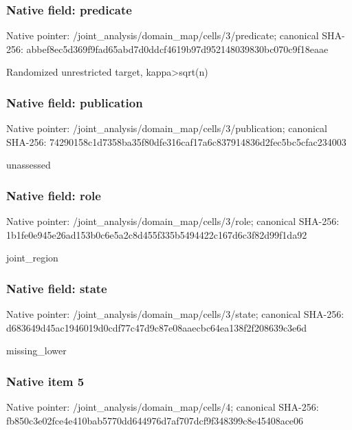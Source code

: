 \documentclass[10pt,a4paper]{article}
\begin{document}
\subsubsection{Native field: predicate}
Native pointer: /joint\_\allowbreak{}analysis/domain\_\allowbreak{}map/cells/3/predicate; canonical SHA-256: abbef8ec5d369f9fad65abd7d0ddcf4619b97d952148039830bc070c9f18eaae

\begingroup\raggedright\sloppy Randomized unrestricted target,\allowbreak{} kappa>sqrt(n)\par\endgroup

\subsubsection{Native field: publication}
Native pointer: /joint\_\allowbreak{}analysis/domain\_\allowbreak{}map/cells/3/publication; canonical SHA-256: 74290158c1d7358ba35f80dfe316caf17a6c837914836d2fec5bc5cfac234003

\begingroup\raggedright\sloppy unassessed\par\endgroup

\subsubsection{Native field: role}
Native pointer: /joint\_\allowbreak{}analysis/domain\_\allowbreak{}map/cells/3/role; canonical SHA-256: 1b1fe0e945e26ad153b0c6e5a2c8d455f335b5494422c167d6c3f82d99f1da92

\begingroup\raggedright\sloppy joint\_\allowbreak{}region\par\endgroup

\subsubsection{Native field: state}
Native pointer: /joint\_\allowbreak{}analysis/domain\_\allowbreak{}map/cells/3/state; canonical SHA-256: d683649d45ac1946019d0cdf77c47d9c87e08aaecbc64ea138f2f208639c3e6d

\begingroup\raggedright\sloppy missing\_\allowbreak{}lower\par\endgroup

\subsubsection{Native item 5}
Native pointer: /joint\_\allowbreak{}analysis/domain\_\allowbreak{}map/cells/4; canonical SHA-256: fb850c3e02fce4e410bab5770dd644976d7af707dcf9f348399c8e45408ace06
\end{document}
